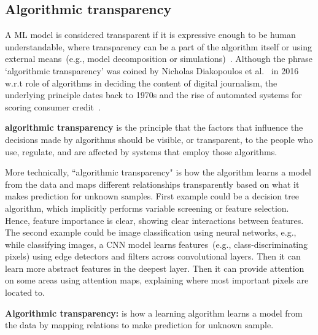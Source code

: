 \subsection{Algorithmic transparency}
A ML model is considered transparent if it is expressive enough to be human understandable, where transparency can be a part of the algorithm itself or using external means~(e.g., model
decomposition or simulations)~\cite{das2020opportunities}. 
Although the phrase `algorithmic transparency' was coined by Nicholas Diakopoulos et al.~\cite{diakopoulos2017algorithmic} in 2016 w.r.t role of algorithms in deciding the content of digital journalism, the underlying principle dates back to 1970s and the rise of automated systems for scoring consumer credit~\cite{diakopoulos2015algorithmic}.  %

\begin{definition}
    {\textbf{algorithmic transparency}} is the principle that the factors that influence the decisions made by algorithms should be visible, or transparent, to the people who use, regulate, and are affected by systems that employ those algorithms.
\end{definition}

\hspace*{3.5mm} More technically, ``algorithmic transparency" is how the algorithm learns a model from the data and maps different relationships transparently based on what it makes prediction for unknown samples. First example could be a decision tree algorithm, which implicitly performs variable screening or feature selection. Hence, feature importance is clear, showing clear interactions between features. The second example could be image classification using neural networks, e.g., while classifying images, a CNN model learns features~(e.g., class-discriminating pixels) using edge detectors and filters across convolutional layers. Then it can learn more abstract features in the deepest layer. Then it can provide attention on some areas using attention maps, explaining where most important pixels are located to. \\

\vspace{-2mm}
\begin{tcolorbox}[colback=white!3!white,colframe=gray!120!black,title=\faBook~Algorithmic transparency]
    \scriptsize{
        \textbf{Algorithmic transparency:} is how a learning algorithm learns a model from the data by mapping relations to make prediction for unknown sample.
        }
\end{tcolorbox}

